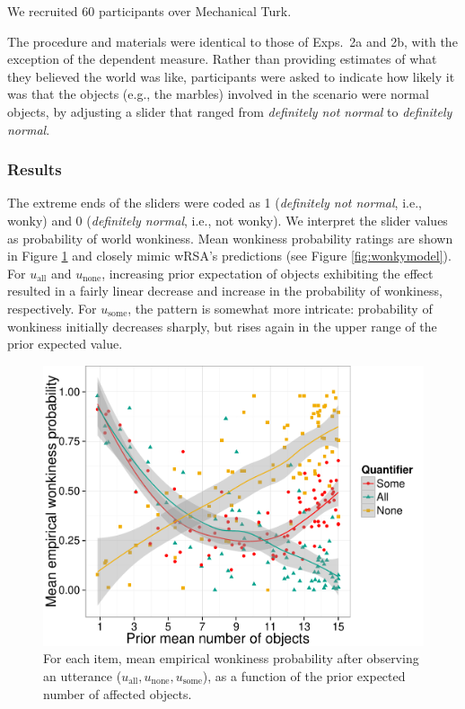 \documentclass[10pt,letterpaper]{article}
\newcommand{\figref}[1]{Figure \ref{#1}}
\begin{document}
We recruited 60 participants over Mechanical Turk.

The procedure and materials were identical to those of Exps.~2a and 2b, with the exception of the dependent measure. Rather than providing estimates of what they believed the world was like, participants were asked to indicate how likely it was that the objects  (e.g., the marbles) involved in the scenario were normal objects, by adjusting a slider that ranged from \emph{definitely not normal} to \emph{definitely normal}.

\subsubsection{Results}

The extreme ends of the sliders were coded as 1 (\emph{definitely not normal}, i.e., wonky) and 0 (\emph{definitely normal}, i.e., not wonky). We interpret the slider values as probability of world wonkiness. Mean wonkiness probability ratings are shown in \figref{fig:wonkyratings} and closely mimic wRSA's predictions (see \figref{fig:wonkymodel}). For $u_{\textrm{all}}$ and $u_{\textrm{none}}$, increasing prior expectation of objects exhibiting the effect resulted in a fairly linear decrease and increase in the probability of wonkiness, respectively. For $u_{\textrm{some}}$, the pattern is somewhat more intricate: probability of wonkiness initially decreases sharply, but rises again in the upper range of the prior expected value. 

\begin{figure}
	\centering
	\includegraphics[width=.43\textwidth]{pics/empirical-wonkiness}
	\caption{For each item, mean empirical wonkiness probability after observing an utterance ($u_{\textrm{all}}, u_{\textrm{none}}, u_{\textrm{some}}$), as a function of the prior expected  number of affected objects.}
	\label{fig:wonkyratings}	
\end{figure}
\end{document}
